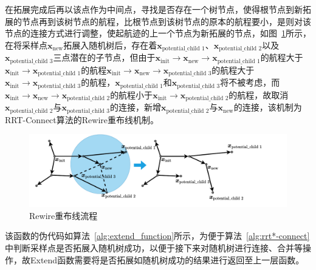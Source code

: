 在拓展完成后再以该点作为中间点，寻找是否存在一个树节点，使得根节点到新拓展的节点再到该树节点的航程，比根节点到该树节点的原本的航程要小，是则对该节点的连接方式进行调整，使起航迹的上一个节点为新拓展的节点，如图~\ref{fig:Rewire重布线流程}所示，在将采样点\( \boldsymbol{x}_{\textrm{new}} \)拓展入随机树后，存在着\( \boldsymbol{x}_{\textrm{potential\_child 1}} \)、\( \boldsymbol{x}_{\textrm{potential\_child 2}} \)以及\( \boldsymbol{x}_{\textrm{potential\_child 3}} \)三点潜在的子节点，但由于\( \boldsymbol{x}_{\textrm{init}} \to \boldsymbol{x}_{\textrm{new}} \to \boldsymbol{x}_{\textrm{potential\_child 1}} \)的航程大于\( \boldsymbol{x}_{\textrm{init}} \to \boldsymbol{x}_{\textrm{potential\_child 1}} \)的航程\( \boldsymbol{x}_{\textrm{init}} \to \boldsymbol{x}_{\textrm{new}} \to \boldsymbol{x}_{\textrm{potential\_child 3}} \)的航程大于\( \boldsymbol{x}_{\textrm{init}} \to \boldsymbol{x}_{\textrm{potential\_child 3}} \)的航程，\( \boldsymbol{x}_{\textrm{potential\_child 1}} \)和\( \boldsymbol{x}_{\textrm{potential\_child 3}} \)将不被考虑，而\( \boldsymbol{x}_{\textrm{init}} \to \boldsymbol{x}_{\textrm{new}} \to \boldsymbol{x}_{\textrm{potential\_child 2}} \)的航程小于\( \boldsymbol{x}_{\textrm{init}} \to \boldsymbol{x}_{\textrm{potential\_child 2}} \)的航程，故取消\( \boldsymbol{x}_{\textrm{potential\_child 2}} \)与\( \boldsymbol{x}_{\textrm{potential\_child 3}} \)的连接，新增\( \boldsymbol{x}_{\textrm{potential\_child 2}} \)与\( \boldsymbol{x}_{\textrm{new}} \)的连接，该机制为RRT-Connect算法的Rewire重布线机制。

\begin{figure}[!htbp]
    \centering
    \includegraphics[width=\textwidth]{images/rewire.pdf}
    \caption{Rewire重布线流程}
    \label{fig:Rewire重布线流程}
\end{figure}

该函数的伪代码如算法~\ref{alg:extend_function}所示，为便于算法~\ref{alg:rrt*-connect}中判断采样点是否拓展入随机树成功，以便于接下来对随机树进行连接、合并等操作，故Extend函数需要将是否拓展如随机树成功的结果进行返回至上一层函数。

